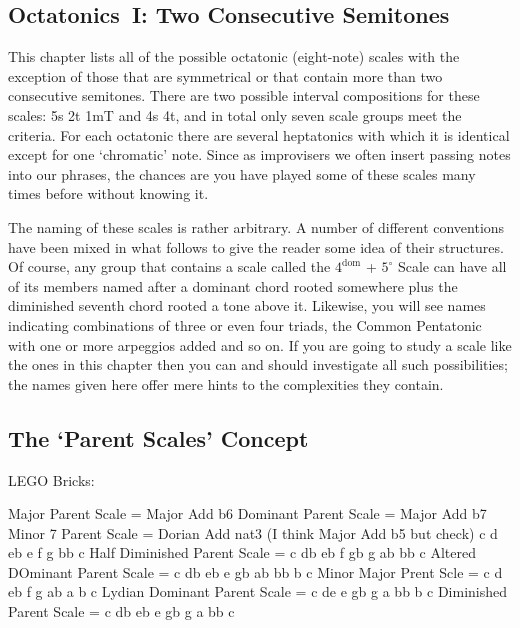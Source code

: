 \documentclass[english]{./gbook}
\newcommand{\titlebreak}{}
\begin{document}
\begin{large}
\chapter{\mbox{Octatonics I:} \titlebreak \mbox{Two} \mbox{Consecutive} \mbox{Semitones}}

This chapter lists all of the possible octatonic (eight-note) scales with the exception of those that are symmetrical or that contain more than two consecutive semitones. There are two possible interval compositions for these scales: 5s 2t 1mT and 4s 4t, and in total only seven scale groups meet the criteria. For each octatonic there are several heptatonics with which it is identical except for one `chromatic' note. Since as improvisers we often insert passing notes into our phrases, the chances are you have played some of these scales many times before without knowing it.

The naming of these scales is rather arbitrary. A number of different conventions have been mixed in what follows to give the reader some idea of their structures. Of course, any group that contains a scale called the $4^{\text{dom}}$ + $5^\circ$ Scale can have all of its members named after a dominant chord rooted somewhere plus the diminished seventh chord rooted a tone above it. Likewise, you will see names indicating combinations of three or even four triads, the Common Pentatonic with one or more arpeggios added and so on. If you are going to study a scale like the ones in this chapter then you can and should investigate all such possibilities; the names given here offer mere hints to the complexities they contain.

\section{The `Parent Scales' Concept}

LEGO Bricks:

Major Parent Scale = Major Add b6
Dominant Parent Scale = Major Add b7
Minor 7 Parent Scale = Dorian Add nat3 (I think Major Add b5 but check) c d eb e f g  bb c
Half Diminished Parent Scale = c db eb f gb g ab bb c
Altered DOminant Parent Scale = c db eb e gb ab bb b c
Minor Major Prent Scle = c d eb f g ab a b c
Lydian Dominant Parent Scale = c de e gb g a bb b c
Diminished Parent Scale = c db eb e gb g a bb c



\end{large}
\end{document}
